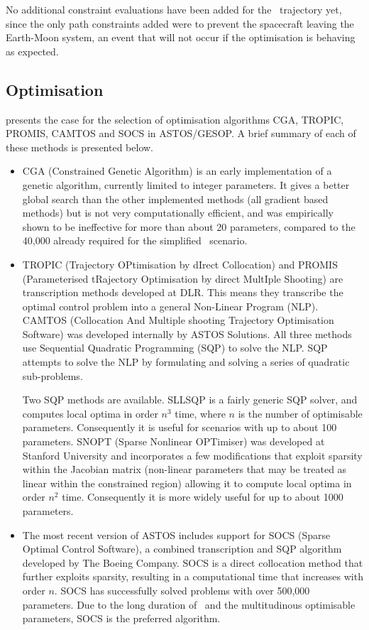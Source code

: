 No additional constraint evaluations have been added for the \BW\ trajectory yet, since the only path constraints added were to prevent the spacecraft leaving the Earth-Moon system, an event that will not occur if the optimisation is behaving as expected.

\subsection{Optimisation} \label{sub:ASTOS-Optimisation}

\textcite{ASTOS_guide} presents the case for the selection of optimisation algorithms CGA, TROPIC, PROMIS, CAMTOS and SOCS in ASTOS/GESOP. A brief summary of each of these methods is presented below.

\begin{itemize}
\item CGA (Constrained Genetic Algorithm) is an early implementation of a genetic algorithm, currently limited to integer parameters. It gives a better global search than the other implemented methods (all gradient based methods) but is not very computationally efficient, and was empirically shown to be ineffective for more than about 20 parameters, compared to the 40,000 already required for the simplified \BW\ scenario.
\item TROPIC (Trajectory OPtimisation by dIrect Collocation) and PROMIS (Parameterised tRajectory Optimisation by direct MultIple Shooting) are transcription methods developed at DLR. This means they transcribe the optimal control problem into a general Non-Linear Program (NLP). CAMTOS (Collocation And Multiple shooting Trajectory Optimisation Software) was developed internally by ASTOS Solutions. All three methods use Sequential Quadratic Programming (SQP) to solve the NLP. SQP attempts to solve the NLP by formulating and solving a series of quadratic sub-problems.

Two SQP methods are available. SLLSQP is a fairly generic SQP solver, and computes local optima in order $n^{3}$ time, where $n$ is the number of optimisable parameters. Consequently it is useful for scenarios with up to about 100 parameters. SNOPT (Sparse Nonlinear OPTimiser) was developed at Stanford University and incorporates a few modifications that exploit sparsity within the Jacobian matrix (non-linear parameters that may be treated as linear within the constrained region) allowing it to compute local optima in order $n^{2}$ time. Consequently it is more widely useful for up to about 1000 parameters.

\item The most recent version of ASTOS includes support for SOCS (Sparse Optimal Control Software), a combined transcription and SQP algorithm developed by The Boeing Company. SOCS is a direct collocation method that further exploits sparsity, resulting in a computational time that increases with order $n$. SOCS has successfully solved problems with over 500,000 parameters. Due to the long duration of \BW\ and the multitudinous optimisable parameters, SOCS is the preferred algorithm.
\end{itemize}


